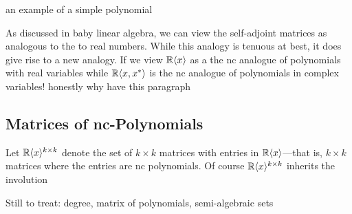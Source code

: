 {\color{blue} an example of a simple polynomial}

As discussed in baby linear algebra, we can view the self-adjoint matrices as
analogous to the to real numbers. While this analogy is tenuous at best, it does
give rise to a new analogy. If we view \(\mathbb{R} \langle x \rangle \) as a the nc analogue of
polynomials with real variables while \(\mathbb{R} \langle x,x^* \rangle \) is the nc
analogue of polynomials in complex variables! {\color{red} honestly why have
  this paragraph}

\subsection{Matrices of nc-Polynomials}

Let \(\mathbb{R} \langle x \rangle ^{k\times k}\) denote the set of \(k \times k\) matrices
with entries in \(\mathbb{R} \langle x \rangle \)---that is, \(k \times  k\) matrices
where the entries are nc polynomials. Of course
\(\mathbb{R} \langle x \rangle ^{k\times k}\) inherits the involution

{\color{blue} Still to treat: degree, matrix of polynomials, semi-algebraic sets}
